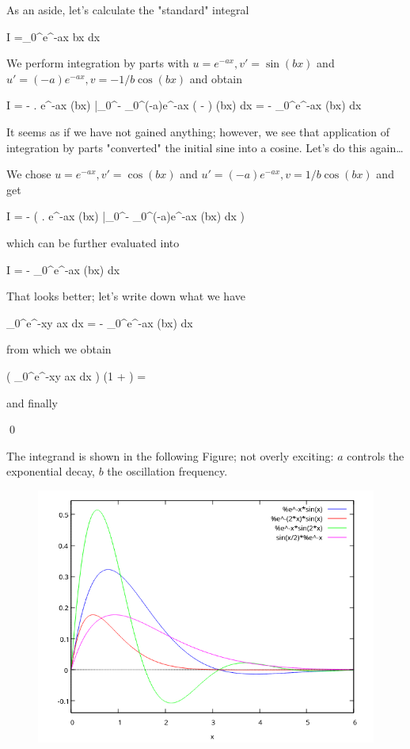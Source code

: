 As an aside, let's calculate the "standard" integral

\bee
I =\int_0^\infty e^{-ax} \sin bx dx
\eee

We perform integration by parts with $u = e^{-ax}, v' = \sin(bx)$ and $u'=(-a)e^{-ax}, v = - 1/b \cos(bx)$ and obtain

\bee
I = - \left.  e^{-ax} \cos(bx) \right|_0^\infty  - \int_0^\infty (-a)e^{-ax} \left( - \right) \cos(bx) dx =  -  \int_0^\infty e^{-ax} \cos(bx) dx
\eee

It seems as if we have not gained anything; however, we see that application of integration by parts "converted" the initial sine into a cosine. Let's do this again\dots

We chose $u = e^{-ax}, v' = \cos(bx)$ and $u'=(-a)e^{-ax}, v = 1/b \cos(bx)$ and get

\bee
I =  -  \left( \left.  e^{-ax} \sin(bx) \right|_0^\infty - \int_0^\infty (-a)e^{-ax}  \sin(bx) dx \right)
\eee

which can be further evaluated into

\bee
I =  -  \int_0^\infty e^{-ax} \sin(bx) dx
\eee

That looks better; let's write down what we have

\bee
\int_0^\infty e^{-xy} \sin ax dx =  -  \int_0^\infty e^{-ax} \sin(bx) dx
\eee

from which we obtain

\bee
\left( \int_0^\infty e^{-xy} \sin ax dx \right) \left(1 +   \right) = 
\eee

and finally

\bee
{} \qed
\eee

The integrand is shown in the following Figure; not overly exciting: $a$ controls the exponential decay, $b$ the oscillation frequency.

\begin{figure}[H]
    \includegraphics[scale=0.7]{images/2022-04-05_plot_1.png}
\end{figure}

